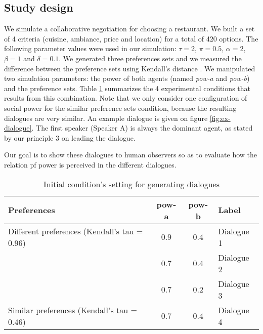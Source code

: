 \documentclass{llncs}
\begin{document}
	\subsection{Study design}
	We simulate a collaborative negotiation for choosing a restaurant. We built a set of 4 criteria (cuisine, ambiance, price and location) for a total of 420 options. The following parameter values were used in our simulation: $\tau=2$, $\pi=0.5$, $\alpha=2$, $\beta=1$ and $\delta=0.1$. We generated three preferences sets and we measured the difference between the preference sets using Kendall's distance \cite{bra2013Kendall}. We manipulated two simulation parameters: the power of both agents (named \emph{pow-a} and \emph{pow-b}) and the preference sets. Table \ref{table:conditions} summarizes the 4 experimental conditions that results from this combination. Note that we only consider one configuration of social power for the similar preference sets condition, because the resulting dialogues are very similar. An example dialogue is given on figure \ref{fig:ex-dialogue}. The first speaker (Speaker A) is always the dominant agent, as stated by our principle 3 on leading the dialogue.
	
	Our goal is to show these dialogues to human observers so as to evaluate how the relation pf power is perceived in the different dialogues.
	\begin{table}
		\centering
		\begin{tabular}{ |l|c|c|l| }
			\hline
			\textbf{Preferences}& \textbf{pow-a} & \textbf{pow-b} & \textbf{Label} \\ 
			\hline
			\newline\multirow{3}{*} {Different preferences (Kendall's tau = $0.96$)} & 0.9 & 0.4 & Dialogue 1 \\ \cline{2-4}
			
			\newline  & 0.7 & 0.4 & Dialogue 2\\ \cline{2-4}
			
			\newline   &0.7 & 0.2 & Dialogue 3\\ 
			\hline
			\newline Similar preferences (Kendall's tau = $0.46$) & 0.7 & 0.4 & Dialogue 4\\
			\hline
		\end{tabular}
		\caption{Initial condition's setting for generating dialogues} 
		\label{table:conditions}
	\end{table}
	
\end{document}
